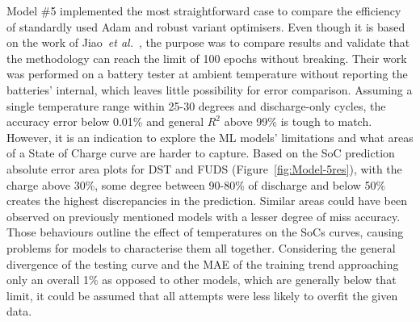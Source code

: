 %
%
Model \#5 implemented the most straightforward case to compare the efficiency of standardly used Adam and robust variant optimisers.
Even though it is based on the work of Jiao~\textit{et al.}~\cite{jiao_gru-rnn_2020}, the purpose was to compare results and validate that the methodology can reach the limit of 100 epochs without breaking.
Their work was performed on a battery tester at ambient temperature without reporting the batteries' internal, which leaves little possibility for error comparison.
Assuming a single temperature range within 25-30 degrees and discharge-only cycles, the accuracy error below 0.01\% and general $R^2$ above 99\% is tough to match.
However, it is an indication to explore the ML models' limitations and what areas of a State of Charge curve are harder to capture.
Based on the SoC prediction absolute error area plots for DST and FUDS (Figure~\ref{fig:Model-5res}), with the charge above 30\%, some degree between 90-80\% of discharge and below 50\% creates the highest discrepancies in the prediction.
Similar areas could have been observed on previously mentioned models with a lesser degree of miss accuracy.
Those behaviours outline the effect of temperatures on the SoCs curves, causing problems for models to characterise them all together.
Considering the general divergence of the testing curve and the MAE of the training trend approaching only an overall 1\% as opposed to other models, which are generally below that limit, it could be assumed that all attempts were less likely to overfit the given data.


